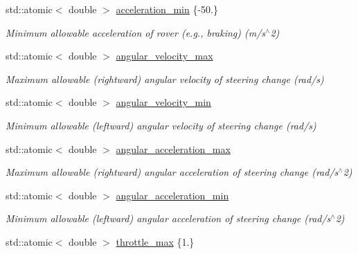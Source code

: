 \begin{DoxyCompactItemize}
\mbox{\label{structackermann_1_1_params_a9b8d3b799a556afb69f3f8acd0abfa66}} 
std\+::atomic$<$ double $>$ \hyperlink{structackermann_1_1_params_a9b8d3b799a556afb69f3f8acd0abfa66}{acceleration\+\_\+min} \{-\/50.\}
\begin{DoxyCompactList}\small\item\em Minimum allowable acceleration of rover (e.\+g., braking) (m/s$^\wedge$2) \end{DoxyCompactList}\item 
std\+::atomic$<$ double $>$ \hyperlink{structackermann_1_1_params_aad93f5ef58bf87db04c9e21f3c1067ca}{angular\+\_\+velocity\+\_\+max}
\begin{DoxyCompactList}\small\item\em Maximum allowable (rightward) angular velocity of steering change (rad/s) \end{DoxyCompactList}\item 
std\+::atomic$<$ double $>$ \hyperlink{structackermann_1_1_params_a20071280825a5dfdf0eba12fa45c6886}{angular\+\_\+velocity\+\_\+min}
\begin{DoxyCompactList}\small\item\em Minimum allowable (leftward) angular velocity of steering change (rad/s) \end{DoxyCompactList}\item 
std\+::atomic$<$ double $>$ \hyperlink{structackermann_1_1_params_a69fd058a9c869f1db12b030a99f3141d}{angular\+\_\+acceleration\+\_\+max}
\begin{DoxyCompactList}\small\item\em Maximum allowable (rightward) angular acceleration of steering change (rad/s$^\wedge$2) \end{DoxyCompactList}\item 
std\+::atomic$<$ double $>$ \hyperlink{structackermann_1_1_params_a5baf993ebf740d79eeb1e19e041ceb8e}{angular\+\_\+acceleration\+\_\+min}
\begin{DoxyCompactList}\small\item\em Minimum allowable (leftward) angular acceleration of steering change (rad/s$^\wedge$2) \end{DoxyCompactList}\item 
\mbox{\label{structackermann_1_1_params_a77e9e8355199625173a243b96963a543}} 
std\+::atomic$<$ double $>$ \hyperlink{structackermann_1_1_params_a77e9e8355199625173a243b96963a543}{throttle\+\_\+max} \{1.\}

\end{DoxyCompactItemize}
